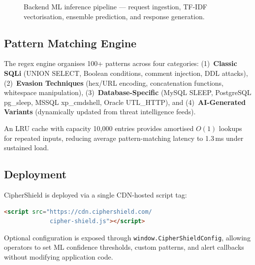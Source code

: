 \documentclass[10pt, twocolumn]{article}
\begin{document}
\begin{figure}[H]
  \centering
  \caption{Backend ML inference pipeline --- request ingestion, 
           TF-IDF vectorisation, ensemble prediction, and response generation.}
  \label{fig:backend}
\end{figure}

\subsection{Pattern Matching Engine}

The regex engine organises 100+ patterns across four categories: 
(1)~\textbf{Classic SQLi} (UNION SELECT, Boolean conditions, comment injection, 
DDL attacks), (2)~\textbf{Evasion Techniques} (hex/URL encoding, 
concatenation functions, whitespace manipulation), 
(3)~\textbf{Database-Specific} (MySQL SLEEP, PostgreSQL pg\_sleep, 
MSSQL xp\_cmdshell, Oracle UTL\_HTTP), and (4)~\textbf{AI-Generated Variants} 
(dynamically updated from threat intelligence feeds).

An LRU cache with capacity 10,000 entries provides amortised $O(1)$ lookups 
for repeated inputs, reducing average pattern-matching latency to 1.3\,ms 
under sustained load.

\subsection{Deployment}

CipherShield is deployed via a single CDN-hosted script tag:

\begin{lstlisting}[language=HTML, caption={One-line integration}]
<script src="https://cdn.ciphershield.com/
             cipher-shield.js"></script>
\end{lstlisting}

Optional configuration is exposed through \texttt{window.CipherShieldConfig}, 
allowing operators to set ML confidence thresholds, custom patterns, and 
alert callbacks without modifying application code.
\end{document}
